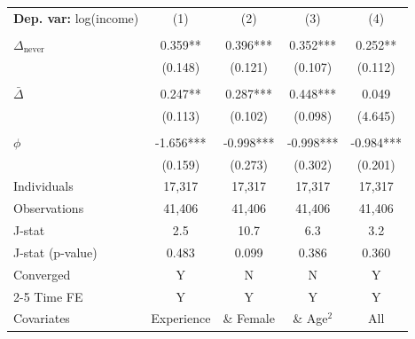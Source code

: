 \begin{tabular}{l cccc} \toprule  \textbf{Dep. var:}  log(income) 
                    &\multicolumn{1}{c}{(1)}   &\multicolumn{1}{c}{(2)}   &\multicolumn{1}{c}{(3)}   &\multicolumn{1}{c}{(4)}   \\
                    &               &               &               &               \\
\addlinespace
$\Delta_{\text{never}}$&       0.359** &       0.396***&       0.352***&       0.252** \\
                    &     (0.148)   &     (0.121)   &     (0.107)   &     (0.112)   \\
                    &               &               &               &               \\
\addlinespace
$\bar{\Delta}$      &       0.247** &       0.287***&       0.448***&       0.049   \\
                    &     (0.113)   &     (0.102)   &     (0.098)   &     (4.645)   \\
                    &               &               &               &               \\
\addlinespace
$\phi$              &      -1.656***&      -0.998***&      -0.998***&      -0.984***\\
                    &     (0.159)   &     (0.273)   &     (0.302)   &     (0.201)   \\
\addlinespace
Individuals         &      17,317   &      17,317   &      17,317   &      17,317   \\
Observations        &      41,406   &      41,406   &      41,406   &      41,406   \\
J-stat              &         2.5   &        10.7   &         6.3   &         3.2   \\
J-stat (p-value)    &       0.483   &       0.099   &       0.386   &       0.360   \\
Converged           &           Y   &           N   &           N   &           Y   \\
\cmidrule{2-5} Time FE & Y & Y & Y & Y \\ Covariates & Experience & \& Female & \& Age$^2$ & All \\ \bottomrule \end{tabular}
